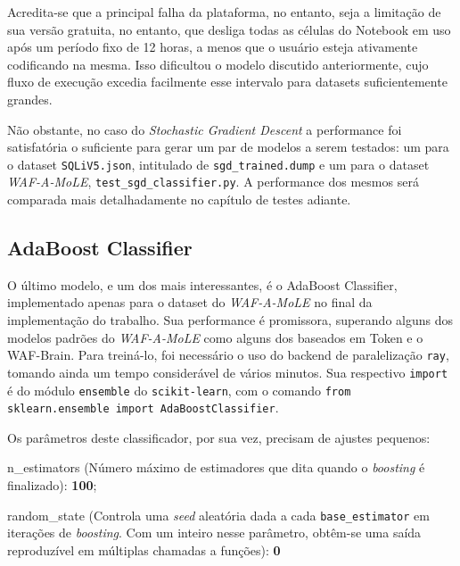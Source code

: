 Acredita-se que a principal falha da plataforma, no entanto, seja a limitação de sua versão gratuita, no entanto, que desliga todas as células do Notebook em uso após um período fixo de 12 horas, a menos que o usuário esteja ativamente codificando na mesma. Isso dificultou o modelo discutido anteriormente, cujo fluxo de execução excedia facilmente esse intervalo para datasets suficientemente grandes.

Não obstante, no caso do \textit{Stochastic Gradient Descent} a performance foi satisfatória o suficiente para gerar um par de modelos a serem testados: um para o dataset \verb+SQLiV5.json+, intitulado de \verb+sgd_trained.dump+ e um para o dataset \textit{WAF-A-MoLE}, \verb+test_sgd_classifier.py+. A performance dos mesmos será comparada mais detalhadamente no capítulo de testes adiante. 

\label{sec:codigos:modelos}
\bigskip

\subsection{AdaBoost Classifier}

O último modelo, e um dos mais interessantes, é o AdaBoost Classifier, implementado apenas para o dataset do \textit{WAF-A-MoLE} no final da implementação do trabalho. Sua performance é promissora, superando alguns dos modelos padrões do \textit{WAF-A-MoLE} como alguns dos baseados em Token e o WAF-Brain. Para treiná-lo, foi necessário o uso do backend de paralelização \verb+ray+, tomando ainda um tempo considerável de vários minutos. Sua respectivo \verb+import+ é do módulo \verb+ensemble+ do \verb+scikit-learn+, com o comando \verb+from sklearn.ensemble import AdaBoostClassifier+. 

Os parâmetros deste classificador, por sua vez, precisam de ajustes pequenos:
\begin{alineas}
\item n\_estimators (Número máximo de estimadores que dita quando o \textit{boosting} é finalizado): \textbf{100};
\item random\_state (Controla uma \textit{seed} aleatória dada a cada \verb+base_estimator+ em iterações de \textit{boosting}. Com um inteiro nesse parâmetro, obtêm-se uma saída reproduzível em múltiplas chamadas a funções): \textbf{0}
\end{alineas}



